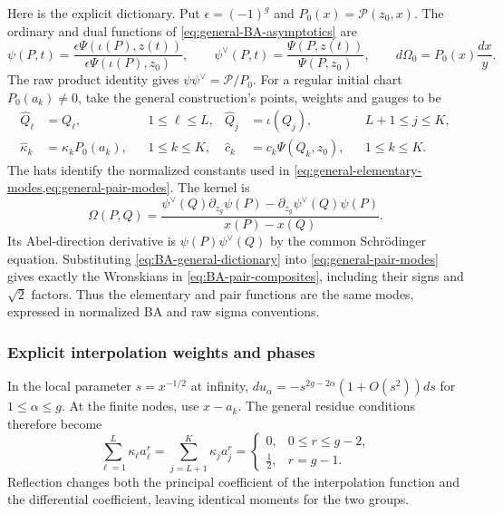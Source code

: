 Here is the explicit dictionary. Put $\epsilon=(-1)^g$ and
$P_0(x)=\mathcal P(z_0,x)$. The ordinary and dual functions of
\cref{eq:general-BA-asymptotics} are
\begin{equation}\label{eq:BA-normalized-sigma}
 \psi(P,t)=\frac{\epsilon\Psi(\iota(P),z(t))}{\epsilon\Psi(\iota(P),z_0)},
 \qquad
 \psi^\vee(P,t)=\frac{\Psi(P,z(t))}{\Psi(P,z_0)},\qquad
 d\Omega_0=P_0(x)\frac{dx}{y}.
\end{equation}
The raw product identity gives $\psi\psi^\vee=\mathcal P/P_0$. For a regular
initial chart $P_0(a_k)\ne0$, take the general construction's points,
weights and gauges to be
\begin{equation}\label{eq:BA-general-dictionary}
\begin{aligned}
 \widehat Q_{\ell}&=Q_{\ell},&&1\leq\ell\leq L,&
 \widehat Q_j&=\iota(Q_j),&&L+1\leq j\leq K,\\
 \widehat\kappa_k&=\kappa_kP_0(a_k),&&1\leq k\leq K,&
 \widehat c_k&=c_k\Psi(Q_k,z_0),&&1\leq k\leq K.
\end{aligned}
\end{equation}
The hats identify the normalized constants used in
\cref{eq:general-elementary-modes,eq:general-pair-modes}.
The kernel is
\begin{equation}\label{eq:BA-hyperelliptic-kernel}
 \Omega(P,Q)=\frac{\psi^\vee(Q)\partial_{z_g}\psi(P)-\partial_{z_g}\psi^\vee(Q)\psi(P)}{x(P)-x(Q)}.
\end{equation}
Its Abel-direction derivative is $\psi(P)\psi^\vee(Q)$ by the common Schr\"odinger equation.
Substituting \cref{eq:BA-general-dictionary} into
\cref{eq:general-pair-modes} gives exactly the Wronskians in
\cref{eq:BA-pair-composites}, including their signs and $\sqrt2$
factors. Thus the elementary and pair functions are the same modes,
expressed in normalized BA and raw sigma conventions.

\subsubsection{Explicit interpolation weights and phases}
\label{sec:BA-interpolation}

In the local parameter $s=x^{-1/2}$ at infinity,
$du_\alpha=-s^{2g-2\alpha}(1+O(s^2))ds$ for
$1\leq\alpha\leq g$. At the finite nodes, use $x-a_k$.
The general residue conditions therefore become
\begin{equation}\label{eq:BA-moments-final}
 \sum_{\ell=1}^{L}\kappa_{\ell} a_{\ell}^r
 =\sum_{j=L+1}^{K}\kappa_j a_j^r
 =\begin{cases}
 0,&0\leq r\leq g-2,\\
 \tfrac12,&r=g-1.
 \end{cases}
\end{equation}
Reflection changes both the principal coefficient of the interpolation
function and the differential coefficient, leaving identical moments
for the two groups.

